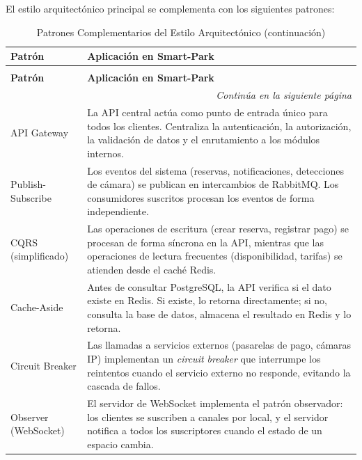 El estilo arquitectónico principal se complementa con los siguientes patrones:

\begin{longtable}{p{3.5cm} p{10.5cm}}
\caption{Patrones Complementarios del Estilo Arquitectónico} \\
\toprule
\textbf{Patrón} & \textbf{Aplicación en Smart-Park} \\
\midrule
\endfirsthead

\caption[]{Patrones Complementarios del Estilo Arquitectónico (continuación)} \\
\toprule
\textbf{Patrón} & \textbf{Aplicación en Smart-Park} \\
\midrule
\endhead

\midrule
\multicolumn{2}{r}{\footnotesize\textit{Continúa en la siguiente página}} \\
\endfoot

\bottomrule
\endlastfoot

API Gateway & La API central actúa como punto de entrada único para todos los clientes. Centraliza la autenticación, la autorización, la validación de datos y el enrutamiento a los módulos internos. \\
\midrule
Publish-Subscribe & Los eventos del sistema (reservas, notificaciones, detecciones de cámara) se publican en intercambios de RabbitMQ. Los consumidores suscritos procesan los eventos de forma independiente. \\
\midrule
CQRS (simplificado) & Las operaciones de escritura (crear reserva, registrar pago) se procesan de forma síncrona en la API, mientras que las operaciones de lectura frecuentes (disponibilidad, tarifas) se atienden desde el caché Redis. \\
\midrule
Cache-Aside & Antes de consultar PostgreSQL, la API verifica si el dato existe en Redis. Si existe, lo retorna directamente; si no, consulta la base de datos, almacena el resultado en Redis y lo retorna. \\
\midrule
Circuit Breaker & Las llamadas a servicios externos (pasarelas de pago, cámaras IP) implementan un \textit{circuit breaker} que interrumpe los reintentos cuando el servicio externo no responde, evitando la cascada de fallos. \\
\midrule
Observer (WebSocket) & El servidor de WebSocket implementa el patrón observador: los clientes se suscriben a canales por local, y el servidor notifica a todos los suscriptores cuando el estado de un espacio cambia. \\
\end{longtable}

